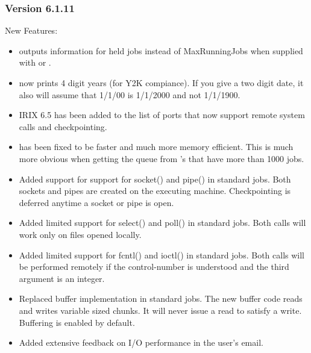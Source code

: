 \subsubsection{\label{sec:New-6-1-11}Version 6.1.11}

\noindent New Features:

\begin{itemize}

\item {} outputs information for held jobs instead of
MaxRunningJobs when supplied with  or .

\item {} now prints 4 digit years (for Y2K compiance). 
If you give a two digit date, it also will assume that 1/1/00 is 1/1/2000
and not 1/1/1900.

\item IRIX 6.5 has been added to the list of ports that now support
remote system calls and checkpointing.

\item {} has been fixed to be faster and much more memory
efficient.  This is much more obvious when getting the queue from
's that have more than 1000 jobs.

\item Added support for support for socket() and pipe() in standard
jobs.  Both sockets and pipes are created on the executing machine.
Checkpointing is deferred anytime a socket or pipe is open.

\item Added limited support for select() and poll() in standard jobs.
Both calls will work only on files opened locally.

\item Added limited support for fcntl() and ioctl() in standard jobs.
Both calls will be performed remotely if the control-number is understood
and the third argument is an integer.

\item Replaced buffer implementation in standard jobs.
The new buffer code reads and writes variable sized chunks.
It will never issue a read to satisfy a write.  Buffering is enabled
by default.

\item Added extensive feedback on I/O performance in the user's email.


\end{itemize}
